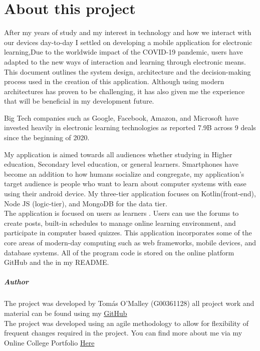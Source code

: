 
\chapter*{About this project}
 
After my years of study and my  interest in technology and how we interact with our devices day-to-day I settled on developing a mobile application for electronic learning,Due to the worldwide impact of the  COVID-19 pandemic, users have adapted to the new ways of interaction and learning through electronic means.\\


This document outlines the system design, architecture and the decision-making process used in the creation of this application. Although using modern architectures has proven to be challenging, it has also given me the experience that will be beneficial in my development future.



Big Tech companies such as Google, Facebook, Amazon, and Microsoft have invested heavily in electronic learning technologies as reported  7.9B across 9 deals since the beginning of 2020. 
 
My application is aimed towards all audiences whether studying in Higher education, Secondary level education, or general learners. Smartphones have become an addition to how humans socialize and congregate, my application's target audience is people who want to learn about computer systems with ease using their android device. My three-tier application focuses on Kotlin(front-end), Node JS (logic-tier), and MongoDB for the data tier.\\


 The application is focused on users as learners . Users can use the forums to create posts,   built-in schedules to manage  online learning environment, and participate in  computer based  quizzes. This application incorporates some of the core areas of modern-day computing such as web frameworks, mobile devices, and  database systems. All of the program code  is  stored on the online platform GitHub and the in my README.\\

 
 




\paragraph{Author}
  The  project was developed by Tomás O'Malley (G00361128) all project work and material can be found using my \href{https://github.com/OmalleyTomas98/MinorDissertation}{GitHub} \\The project was developed using an agile methodology to allow  for flexibility of frequent changes required in the project.
 You can find more about me via my Online College Portfolio  \href{https://omalleytomas98.github.io}{Here}


